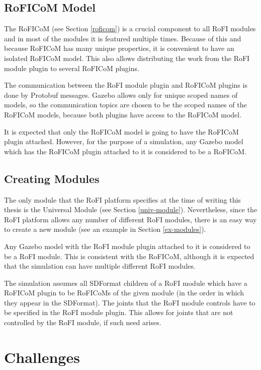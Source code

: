\documentclass[
  printed, %
  color,   %
  notable, %
  oneside, %
  nolof,   %
  nolot,   %
  nocover,
]{fithesis3}
\begin{document}
\subsection{RoFICoM Model}

The RoFICoM (see Section \ref{roficom}) is a crucial component to all RoFI modules and in most of the modules it is featured multiple times.
Because of this and because RoFICoM has many unique properties, it is convenient to have an isolated RoFICoM model.
This also allows distributing the work from the RoFI module plugin to several RoFICoM plugins.

The communication between the RoFI module plugin and RoFICoM plugins is done by Protobuf messages.
Gazebo allows only for unique scoped names of models, so the communication topics are chosen to be the scoped names of the RoFICoM models, because both plugins have access to the RoFICoM model.

It is expected that only the RoFICoM model is going to have the RoFICoM plugin attached.
However, for the purpose of a simulation, any Gazebo model which has the RoFICoM plugin attached to it is considered to be a RoFICoM.

\subsection{Creating Modules}

The only module that the RoFI platform specifies at the time of writing this thesis is the Universal Module (see Section \ref{univ-module}).
Nevertheless, since the RoFI platform allows any number of different RoFI modules, there is an easy way to create a new module (see an example in Section \ref{ex-modules}).

Any Gazebo model with the RoFI module plugin attached to it is considered to be a RoFI module.
This is consistent with the RoFICoM, although it is expected that the simulation can have multiple different RoFI modules.

The simulation assumes all SDFormat children of a RoFI module which have a RoFICoM plugin to be RoFICoMs of the given module (in the order in which they appear in the SDFormat).
The joints that the RoFI module controls have to be specified in the RoFI module plugin.
This allows for joints that are not controlled by the RoFI module, if such need arises.

\section{Challenges}
\end{document}
